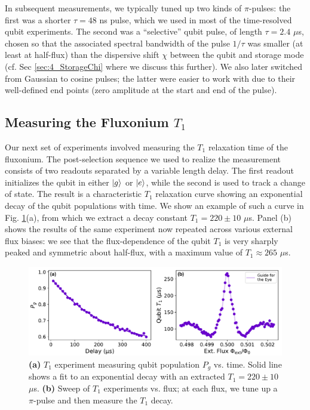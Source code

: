 In subsequent measurements, we typically tuned up two kinds of $\pi$-pulses: the first was a shorter $\tau = 48$ ns pulse, which we used in most of the time-resolved qubit experiments. The second was a ``selective'' qubit pulse, of length $\tau = 2.4$ $\mu$s, chosen so that the associated spectral bandwidth of the pulse $1/\tau$ was smaller (at least at half-flux) than the dispersive shift $\chi$ between the qubit and storage mode (cf. Sec \ref{sec:4_StorageChi} where we discuss this further). We also later switched from Gaussian to cosine pulses; the latter were easier to work with due to their well-defined end points (zero amplitude at the start and end of the pulse). 

\subsection{Measuring the Fluxonium \texorpdfstring{$T_1$}{T1}\label{sec:4_fluxonium_T1}}

Our next set of experiments involved measuring the $T_1$ relaxation time of the fluxonium. The post-selection sequence we used to realize the measurement consists of two readouts separated by a variable length delay. The first readout initializes the qubit in either $\lvert g\rangle$ or $\lvert e\rangle$, while the second is used to track a change of state. The result is a characteristic $T_1$ relaxation curve showing an exponential decay of the qubit populations with time. We show an example of such a curve in Fig. \ref{fig:4_qubit_T1_vs_flux_single}(a), from which we extract a decay constant $T_1 = 220 \pm 10$ $\mu$s. Panel (b) shows the results of the same experiment now repeated across various external flux biases: we see that the flux-dependence of the qubit $T_1$ is very sharply peaked and symmetric about half-flux, with a maximum value of $T_1 \approx 265$ $\mu$s.

\begin{figure}[h]
    \centering
    \includegraphics[width=0.95\linewidth]{Figures/4/qubit_T1_vs_flux_single.pdf}
    \caption[Qubit \texorpdfstring{$T_1$}{T1} experiment and sweep of \texorpdfstring{$T_1$}{T1} vs. flux.]{\textbf{(a)} $T_1$ experiment measuring qubit population $P_g$ vs. time. Solid line shows a fit to an exponential decay with an extracted $T_1 = 220 \pm 10$ $\mu$s. \textbf{(b)} Sweep of $T_1$ experiments vs. flux; at each flux, we tune up a $\pi$-pulse and then measure the $T_1$ decay.}
    \label{fig:4_qubit_T1_vs_flux_single}
\end{figure}

